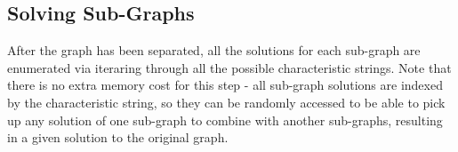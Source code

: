 \documentclass[conference]{IEEEtran}
\begin{document}
\subsection{Solving Sub-Graphs}
After the graph has been separated, all the solutions for each sub-graph are enumerated via iteraring through all the possible characteristic strings. 
Note that there is no extra memory cost for this step - all sub-graph solutions are indexed by the characteristic string, so they can be randomly accessed 
to be able to pick up any solution of one sub-graph to combine with another sub-graphs, resulting in a given solution to the original graph. 

 
\end{document}
